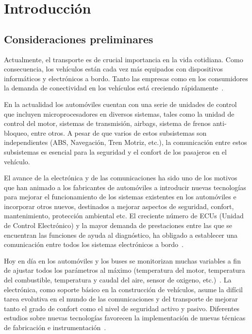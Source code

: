 

\chapter[Introducción]{Introducción}

\section{Consideraciones preliminares}

Actualmente, el transporte es de crucial importancia en la vida cotidiana. Como consecuencia, los vehículos están cada vez más equipados con dispositivos informáticos y electrónicos a bordo. 
Tanto las empresas como en los consumidores la demanda de conectividad en los vehículos está creciendo rápidamente~\cite{VWC}.

En la actualidad los automóviles cuentan con una serie de unidades de control que incluyen microprocesadores en diversos sistemas, tales como la unidad de control del motor, sistemas de transmisión, airbags, sistema de frenos anti-bloqueo, entre otros. A pesar de que varios de estos subsistemas son independientes (ABS, Navegación, Tren Motriz, etc.), la comunicación entre estos subsistemas es esencial para la seguridad y el confort de los pasajeros en el vehículo.

 El avance de la electrónica y de las comunicaciones ha sido uno de los motivos que han animado a los fabricantes de automóviles a introducir nuevas tecnologías para mejorar el funcionamiento de los sistemas existentes en los automóviles e incorporar otros nuevos, destinados a mejorar aspectos de seguridad, confort, mantenimiento, protección ambiental etc. 
 El creciente número de ECUs (Unidad de Control Electrónico) y la mayor demanda de prestaciones entre las que se encuentran las funciones de ayuda al diagnóstico, ha obligado a establecer una comunicación entre todos los sistemas electrónicos a bordo~\cite{EA}.

Hoy en día en los automóviles y los buses se monitorizan muchas variables a fin de ajustar todos los parámetros al máximo (temperatura del motor, temperatura del combustible, temperatura y caudal del aire, sensor de oxigeno, etc.)~\cite{DUCE}. 
La electrónica, como soporte básico en la construcción de vehículos, asume la difícil tarea evolutiva en el mundo de las comunicaciones y del transporte de  mejorar tanto el grado de confort como el nivel de seguridad activo y pasivo. 
Diferentes estudios sobre nuevas tecnologías favorecen la implementación de nuevas técnicas de fabricación e instrumentación~\cite{TSA}.


